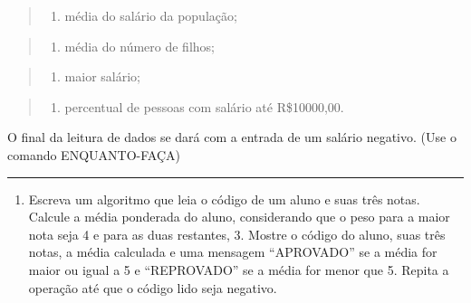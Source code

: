 \documentclass[12pt,a4paper]{article}
\providecommand{\tightlist}{%
      \setlength{\itemsep}{0pt}\setlength{\parskip}{0pt}}
\begin{document}
\begin{quote}
\begin{enumerate}
\def\labelenumi{\alph{enumi})}
\tightlist
\item
  média do salário da população;
\end{enumerate}
\end{quote}

\begin{quote}
\begin{enumerate}
\def\labelenumi{\alph{enumi})}
\setcounter{enumi}{1}
\tightlist
\item
  média do número de filhos;
\end{enumerate}
\end{quote}

\begin{quote}
\begin{enumerate}
\def\labelenumi{\alph{enumi})}
\setcounter{enumi}{2}
\tightlist
\item
  maior salário;
\end{enumerate}
\end{quote}

\begin{quote}
\begin{enumerate}
\def\labelenumi{\alph{enumi})}
\setcounter{enumi}{3}
\tightlist
\item
  percentual de pessoas com salário até R\$10000,00.
\end{enumerate}
\end{quote}

O final da leitura de dados se dará com a entrada de um salário
negativo. (Use o comando ENQUANTO-FAÇA)

    \begin{center}\rule{0.5\linewidth}{0.5pt}\end{center}

\begin{enumerate}
\def\labelenumi{\arabic{enumi}.}
\setcounter{enumi}{5}
\tightlist
\item
  Escreva um algoritmo que leia o código de um aluno e suas três notas.
  Calcule a média ponderada do aluno, considerando que o peso para a
  maior nota seja 4 e para as duas restantes, 3. Mostre o código do
  aluno, suas três notas, a média calculada e uma mensagem ``APROVADO''
  se a média for maior ou igual a 5 e ``REPROVADO'' se a média for menor
  que 5. Repita a operação até que o código lido seja negativo.
\end{enumerate}
\end{document}
